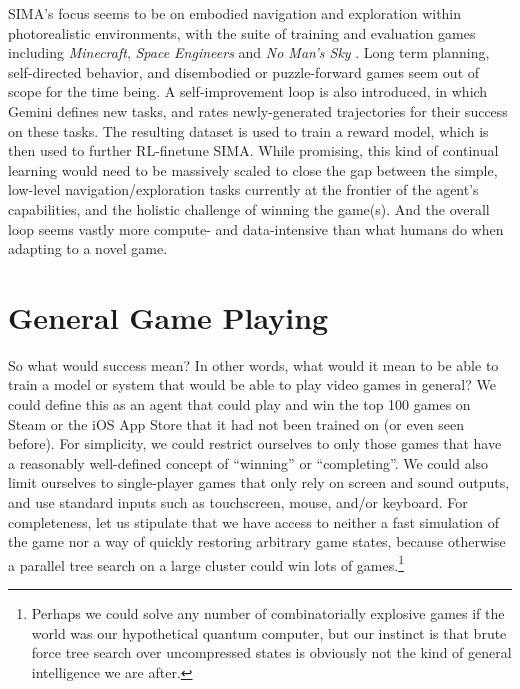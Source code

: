 \documentclass[runningheads]{llncs}
\begin{document}
SIMA's focus seems to be on embodied navigation and exploration within photorealistic environments, with the suite of training and evaluation games including \textit{Minecraft}, \textit{Space Engineers} \cite{space_engineers} and \textit{No Man's Sky} \cite{no_mans_sky}. Long term planning, self-directed behavior, and disembodied or puzzle-forward games seem out of scope for the time being. A self-improvement loop is also introduced, in which Gemini defines new tasks, and rates newly-generated trajectories for their success on these tasks. The resulting dataset is used to train a reward model, which is then used to further RL-finetune SIMA. While promising, this kind of continual learning would need to be massively scaled to close the gap between the simple, low-level navigation/exploration tasks currently at the frontier of the agent's capabilities, and the holistic challenge of winning the game(s).
And the overall loop seems vastly more compute- and data-intensive than what humans do when adapting to a novel game.


\section{General Game Playing}

So what would success mean? In other words, what would it mean to be able to train a model or system that would be able to play video games in general? We could define this as an agent that could play and win the top 100 games on Steam or the iOS App Store that it had not been trained on (or even seen before). For simplicity, we could restrict ourselves to only those games that have a reasonably well-defined concept of ``winning'' or ``completing''. We could also limit ourselves to single-player games that only rely on screen and sound outputs, and use standard inputs such as touchscreen, mouse, and/or keyboard. For completeness, let us stipulate that we have access to neither a fast simulation of the game nor a way of quickly restoring arbitrary game states, because otherwise a parallel tree search on a large cluster could win lots of games.\footnote{Perhaps we could solve any number of combinatorially explosive games if the world was our hypothetical quantum computer, but our instinct is that brute force tree search over uncompressed states is obviously not the kind of general intelligence we are after.}
\end{document}
